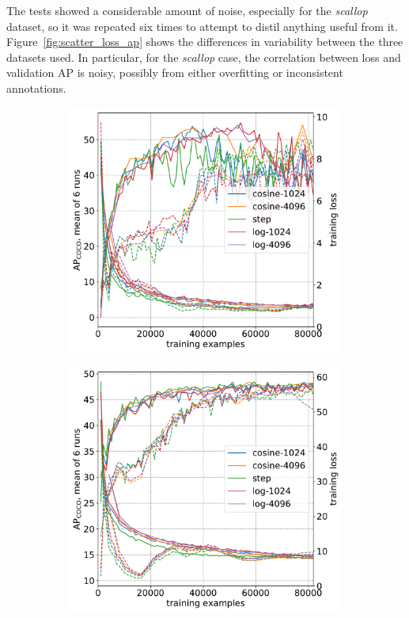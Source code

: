 The tests showed a considerable amount of noise, especially for the \emph{scallop} dataset, so it was repeated six times to attempt to distil anything useful from it. Figure~\ref{fig:scatter_loss_ap} shows the differences in variability between the three datasets used. In particular, for the \emph{scallop} case, the correlation between loss and validation \gls{AP} is noisy, possibly from either overfitting or inconsistent annotations.

\begin{figure}[htb]
\centering
\begin{subfigure}[t]{0.5\linewidth}
  \includegraphics[width=1.0\linewidth]{charts/training/lr_schedule/scallops.pdf}
  \caption{}
\end{subfigure}%
\begin{subfigure}[t]{0.5\linewidth}
  \includegraphics[width=1.0\linewidth]{charts/training/lr_schedule/apples.pdf}

\end{subfigure}
\end{figure}
